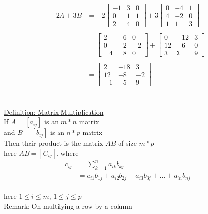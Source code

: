 \documentclass{jhwhw}
\begin{document}
\begin{align*} -2A + 3B &= -2 \begin{bmatrix} -1 & 3 & 0 \\ 0 & 1 & 1 \\ 2 & 4 & 0 \end{bmatrix} + 3 \begin{bmatrix} 0 & -4 & 1 \\ 4 & -2 & 0 \\ 1 & 1 & 3 \end{bmatrix}\\ \\
&= \begin{bmatrix} 2 & -6 & 0 \\ 0 & -2 & -2 \\ -4 & -8 & 0 \end{bmatrix} + \begin{bmatrix}  0 & -12 & 3 \\ 12 & -6 & 0 \\ 3 & 3 & 9 \end{bmatrix}\\ \\
&= \begin{bmatrix} 2 & -18 & 3 \\ 12 & -8 & -2 \\ -1 & -5 & 9 \end{bmatrix}
\end{align*}
\\ \\

\underline{Definition: Matrix Multiplication}\\
If \(A = [a_{ij}]\) is an \(m*n\) matrix\\
and \(B = [b_{ij}]\) is an \(n*p\) matrix\\

Then their product is the matrix \(AB\) of size \(m*p\)\\
here \(AB = [C_{ij}]\), where\\
\begin{align*} c_{ij} &= \sum_{k=1}^{n} a_{ik} b_{kj} \\
&= a_{i1}b_{1j} + a_{i2}b_{2j} + a_{i3}b_{3j} + \ldots + a_{in}b_{nj}
\end{align*}
\\
here \(1 \leq i \leq m, \, 1 \leq j \leq p\)\\

Remark: On multilying a row by a column\\
\end{document}
